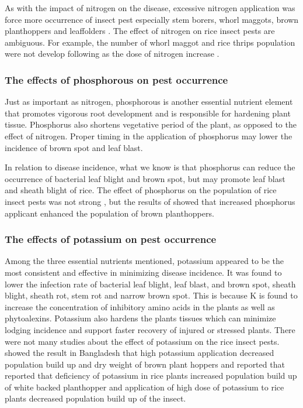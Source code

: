As with the impact of nitrogen on the disease, excessive nitrogen application was force more occurrence of insect pest especially stem borers, whorl maggots, brown planthoppers and leaffolders \citep{Chau_2003_Impacts, Litsinger_2011_Cultural, Rashid_2014_Effect}. The effect of nitrogen on rice insect pests are ambiguous. For example, the number of whorl maggot and rice thrips population were not develop following as the dose of nitrogen increase \citep{Chau_2003_Impacts}.

\subsubsection{The effects of phosphorous on pest occurrence}

Just as important as nitrogen, phosphorous is another essential nutrient element that promotes vigorous root development and is responsible for hardening plant tissue. Phosphorus also shortens vegetative period of the plant, as opposed to the effect of nitrogen. Proper timing in the application of phosphorus may lower the incidence of brown spot and leaf blast.

In relation to disease incidence, what we know is that phosphorus can reduce the occurrence of bacterial leaf blight and brown spot, but may promote leaf blast and sheath blight of rice. The effect of phosphorus on the population of rice insect pests was not strong \citep{Chau_2003_Impacts, Rashid_2014_Effect}, but the results of \cite{Rashid_2014_Effect} showed that increased phosphorus applicant enhanced the population of brown planthoppers.

\subsubsection{The effects of potassium on pest occurrence}

Among the three essential nutrients mentioned, potassium appeared to be the most consistent and effective in minimizing disease incidence. It was found to lower the infection rate of bacterial leaf blight, leaf blast, and brown spot, sheath blight, sheath rot, stem rot and narrow brown spot. This is because K is found to increase the concentration of inhibitory amino acids in the plants as well as phytoalexins. Potassium also hardens the plants tissues which can minimize lodging incidence and support faster recovery of injured or stressed plants. There were not many studies about the effect of potassium on the rice insect pests. \cite{Rashid_2014_Effect} showed the result in Bangladesh that high potassium application decreased population build up and dry weight of brown plant hoppers and \cite{Salim_2002_Effects} reported that reported that deficiency of potassium in rice plants increased population build up of white backed planthopper and application of high dose of potassium to rice plants decreased population build up of the insect.

